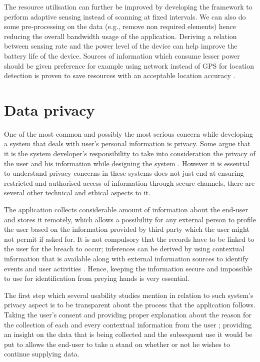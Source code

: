 \documentclass[12pt]{report}
\begin{document}
The resource utilisation can further be improved by developing the framework to perform adaptive sensing instead of scanning at fixed intervals. We can also do some pre-processing on the data (e.g., remove non required elements) hence reducing the overall bandwidth usage of the application. Deriving a relation between sensing rate and the power level of the device can help improve the battery life of the device. Sources of information which consume lesser power should be given preference for example using network instead of GPS for location detection is proven to save resources with an acceptable location accuracy \cite{zhuang2010improving}.

\section{Data privacy}
\label{UserPrivacy}
One of the most common and possibly the most serious concern while developing a system that deals with user's personal information is privacy. Some argue that it is the system developer's responsibility to take into consideration the privacy of the user and his information while designing the system \cite{adams2001privacy}. However it is essential to understand privacy concerns in these systems does not just end at ensuring restricted and authorised access of information through secure channels, there are several other technical and ethical aspects to it.

The application collects considerable amount of information about the end-user and stores it remotely, which allows a possibility for any external person to profile the user based on the information provided by third party which the user might not permit if asked for. It is not compulsory that the records have to be linked to the user for the breach to occur; inferences can be derived by using contextual information that is available along with external information sources to identify events and user activities \cite{minch2004privacy}. Hence, keeping the information secure and impossible to use for identification from preying hands is very essential.

The first step which several usability studies mention in relation to such system's privacy aspect is to be transparent about the process that the application follows. Taking the user's consent and providing proper explanation about the reason for the collection of each and every contextual information from the user \cite{SymmKK2006,picard2002computers}; providing an insight on the data that is being collected and the subsequent use it would be put to allows the end-user to take a stand on whether or not he wishes to continue supplying data.
\end{document}

